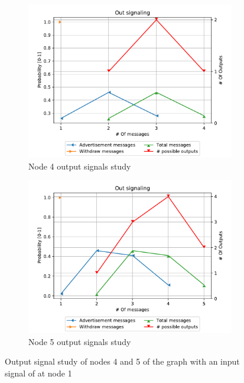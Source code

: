 \begin{figure}[h]
     \centering
     \begin{subfigure}[b]{0.45\textwidth}
         \centering
         \includegraphics[width=\textwidth]{images/signal_study/fig_4/fig_4_4_signaling_nmessage_prob.pdf}
		 \caption{Node \num{4} output signals study}
         \label{fig:signal_node4}
     \end{subfigure}
     \hfill
     \begin{subfigure}[b]{0.45\textwidth}
         \centering
         \includegraphics[width=\textwidth]{images/signal_study/fig_4/fig_4_5_signaling_nmessage_prob.pdf}
		 \caption{Node \num{5} output signals study}
         \label{fig:signal_node5}
     \end{subfigure}
		\caption{Output signal study of nodes \num{4} and \num{5} of the graph 
			 with an input signal of  at node \num{1}}
        \label{fig:signal_griffin_fig4}
\end{figure}

